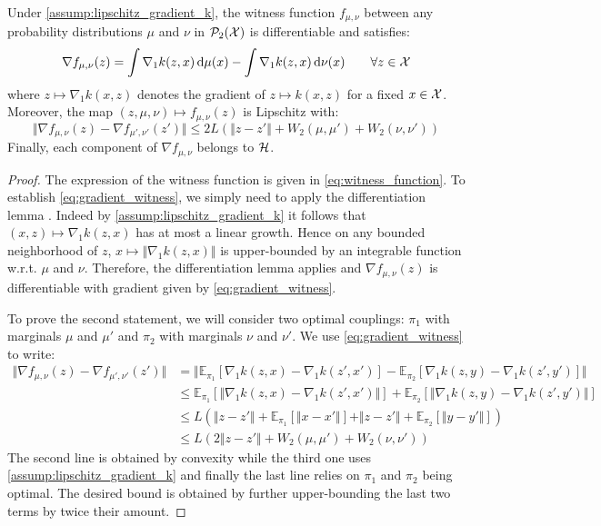 \begin{proposition}\label{prop:grad_witness_function}
Under \cref{assump:lipschitz_gradient_k}, the witness function $f_{\mu,\nu}$ between any probability distributions $\mu$ and $\nu$ in $\mathcal{P}_2({{\mathcal X}})$ is differentiable and satisfies:
\begin{equation}\label{eq:gradient_witness}
\nabla f_{\mu,\nu}(z) = \int \nabla_1 k(z,x)\mathop{}\!\mathrm{d} \mu(x) - \int \nabla_1 k(z,x)\mathop{}\!\mathrm{d} \nu(x) \qquad \forall z\in {{\mathcal X}}
\end{equation}
where $z \mapsto \nabla_1 k(x,z)$ denotes the gradient of $z\mapsto k(x,z)$ for a fixed $x \in {{\mathcal X}}$.
 Moreover, the map $(z,\mu,\nu)\mapsto f_{\mu,\nu}(z)$ is Lipschitz with:
\begin{equation}\label{eq:lipschitz_grad_witness}
\Vert \nabla f_{\mu,\nu}(z) - \nabla f_{\mu',\nu'}(z')\Vert \leq 2L (\Vert z-z' \Vert + W_2(\mu,\mu') + W_2(\nu,\nu')) 
\end{equation}
Finally, each component of $\nabla f_{\mu,\nu}$ belongs to ${{\mathcal H}}$.
\end{proposition}
\begin{proof}
	The expression of the witness function is given in \eqref{eq:witness_function}. To establish \eqref{eq:gradient_witness}, we simply need to apply the differentiation lemma \cite[Theorem 6.28]{Klenke:2008}. Indeed by \cref{assump:lipschitz_gradient_k} it follows that $ (x,z)\mapsto \nabla_1 k(z,x)$ has at most a linear growth. Hence on any bounded neighborhood of $z$, $x\mapsto \Vert \nabla_1 k(z,x) \Vert $ is upper-bounded by an integrable function w.r.t. $\mu$ and $\nu$. Therefore, the differentiation lemma applies and  $\nabla f_{\mu,\nu}(z)$ is differentiable with gradient given by \cref{eq:gradient_witness}.
	
	To prove the second statement, we will consider two optimal couplings: $\pi_1$ with marginals $\mu$ and $\mu'$ and $\pi_2$ with marginals $\nu$ and $\nu'$.  We use \cref{eq:gradient_witness} to write:
	\begin{align*}
		\Vert \nabla f_{\mu,\nu}(z) - \nabla f_{\mu',\nu'}(z')\Vert 
		&= \Vert \mathbb{E}_{\pi_1}[ \nabla_1 k(z,x)-\nabla_1 k(z',x') ] - \mathbb{E}_{\pi_2}[\nabla_1 k(z,y)-\nabla_1 k(z',y')] \Vert\\
		& \leq
		\mathbb{E}_{\pi_1}[ \Vert  \nabla_1 k(z,x)-\nabla_1 k(z',x') \Vert ] + \mathbb{E}_{\pi_2}[\Vert  \nabla_1 k(z,y)-\nabla_1 k(z',y') \Vert ] \\
		&\leq
		L\left( \Vert  z-z' \Vert + \mathbb{E}_{\pi_1}[\Vert  x-x' \Vert]  +  \Vert  z-z' \Vert + \mathbb{E}_{\pi_2}[\Vert  y-y' \Vert ] \right)\\
		&\leq L(2\Vert z-z'\Vert + W_2(\mu,\mu')  + W_2(\nu,\nu') )
	\end{align*}
	The second line is obtained by convexity while the third one uses \cref{assump:lipschitz_gradient_k} and finally the last line relies on $\pi_1$ and $\pi_2$ being optimal. The desired bound is obtained by further upper-bounding the last two terms by twice their amount.
\end{proof}

